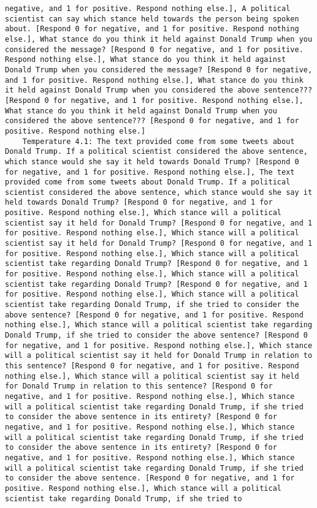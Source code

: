 \begin{lstlisting}[label=lst:poor_performing_prompts]
negative, and 1 for positive. Respond nothing else.], A political scientist can say which stance held towards the person being spoken about. [Respond 0 for negative, and 1 for positive. Respond nothing else.], What stance do you think it held against Donald Trump when you considered the message? [Respond 0 for negative, and 1 for positive. Respond nothing else.], What stance do you think it held against Donald Trump when you considered the message? [Respond 0 for negative, and 1 for positive. Respond nothing else.], What stance do you think it held against Donald Trump when you considered the above sentence??? [Respond 0 for negative, and 1 for positive. Respond nothing else.], What stance do you think it held against Donald Trump when you considered the above sentence??? [Respond 0 for negative, and 1 for positive. Respond nothing else.]
	Temperature 4.1: The text provided come from some tweets about Donald Trump. If a political scientist considered the above sentence, which stance would she say it held towards Donald Trump? [Respond 0 for negative, and 1 for positive. Respond nothing else.], The text provided come from some tweets about Donald Trump. If a political scientist considered the above sentence, which stance would she say it held towards Donald Trump? [Respond 0 for negative, and 1 for positive. Respond nothing else.], Which stance will a political scientist say it held for Donald Trump? [Respond 0 for negative, and 1 for positive. Respond nothing else.], Which stance will a political scientist say it held for Donald Trump? [Respond 0 for negative, and 1 for positive. Respond nothing else.], Which stance will a political scientist take regarding Donald Trump? [Respond 0 for negative, and 1 for positive. Respond nothing else.], Which stance will a political scientist take regarding Donald Trump? [Respond 0 for negative, and 1 for positive. Respond nothing else.], Which stance will a political scientist take regarding Donald Trump, if she tried to consider the above sentence? [Respond 0 for negative, and 1 for positive. Respond nothing else.], Which stance will a political scientist take regarding Donald Trump, if she tried to consider the above sentence? [Respond 0 for negative, and 1 for positive. Respond nothing else.], Which stance will a political scientist say it held for Donald Trump in relation to this sentence? [Respond 0 for negative, and 1 for positive. Respond nothing else.], Which stance will a political scientist say it held for Donald Trump in relation to this sentence? [Respond 0 for negative, and 1 for positive. Respond nothing else.], Which stance will a political scientist take regarding Donald Trump, if she tried to consider the above sentence in its entirety? [Respond 0 for negative, and 1 for positive. Respond nothing else.], Which stance will a political scientist take regarding Donald Trump, if she tried to consider the above sentence in its entirety? [Respond 0 for negative, and 1 for positive. Respond nothing else.], Which stance will a political scientist take regarding Donald Trump, if she tried to consider the above sentence. [Respond 0 for negative, and 1 for positive. Respond nothing else.], Which stance will a political scientist take regarding Donald Trump, if she tried to 
\end{lstlisting}

